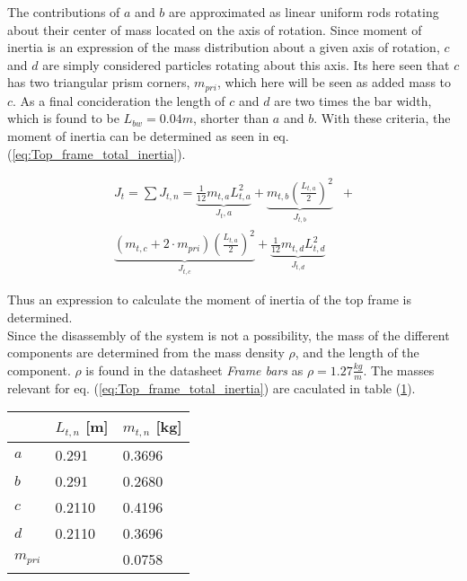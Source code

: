 \documentclass[../../main]{subfiles}
\begin{document}

The contributions of $a$ and $b$ are approximated as linear uniform rods rotating about their center of mass located on the axis of rotation. Since moment of inertia is an expression of the mass distribution about a given axis of rotation, $c$ and $d$ are simply considered particles  rotating about this axis. Its here seen that $c$ has two triangular prism corners, $m_{pri}$, which here will be seen as added mass to $c$. As a final concideration the length of $c$ and $d$ are two times the bar width, which is found to be $L_{bw} = 0.04m$, shorter than $a$ and $b$. With these criteria, the moment of inertia can be determined as seen in eq. (\ref{eq:Top_frame_total_inertia}).

\begin{equation}
  \label{eq:Top_frame_total_inertia}
\begin{split}
  J_t = \sum J_{t,n} =
  \underbrace{\frac{1}{12}m_{t,a}L_{t,a}^2}_\text{$J_t,a$} +
  \underbrace{m_{t,b}\left(\frac{L_{t,a}}{2}\right)^2}_\text{$J_{t,b}$} &+ \\
  \underbrace{(m_{t,c} + 2\cdot m_{pri})\left(\frac{L_{t,a}}{2}\right)^2}_\text{$J_{t,c}$} +
  \underbrace{\frac{1}{12}m_{t,d}L_{t,d}^2}_\text{$J_{t,d}$}
\end{split}
\end{equation}

Thus an expression to calculate the moment of inertia of the top frame is determined.\\

Since the disassembly of the system is not a possibility, the mass of the different components are determined from the mass density $\rho$, and the length of the component. $\rho$ is found in the datasheet \textit{Frame bars} as $\rho = 1.27 \frac{kg}{m}$. The masses relevant for eq. (\ref{eq:Top_frame_total_inertia}) are caculated in table (\ref{tab:mass_table}).

\begin{table}[H]
\centering
\begin{tabular}{|l|l|l|}
\hline
  & $L_{t,n}$ [m]  & $m_{t,n}$ [kg]  \\
\hline
$a$ & 0.291  & 0.3696  \\
\hline
$b$ & 0.291  & 0.2680  \\
\hline
$c$ & 0.2110 & 0.4196  \\
\hline
$d$ & 0.2110 & 0.3696  \\
\hline
$m_{pri}$ & & 0.0758 \\
\hline
\end{tabular}
    \label{tab:mass_table}
\end{table}
\end{document}
